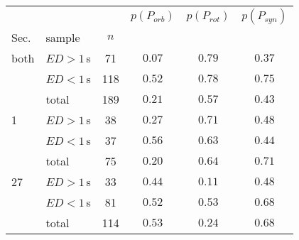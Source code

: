 \begin{tabular}{llcccc}
\hline
          &  &      & $p(P_{orb})$ & $p(P_{rot})$ & $p(P_{syn})$ \\
Sec. & sample &     $n$ &              &              &              \\
\hline
both & $ED>1\,$s &   71 &       $\mathbf{0.07}$ &       $0.79$ &       $0.37$ \\
          & $ED<1\,$s &  118 &       $0.52$ &       $0.78$ &       $0.75$ \\
          & total &  189 &       $0.21$ &       $0.57$ &       $0.43$ \\
1 & $ED>1\,$s &   38 &       $0.27$ &       $0.71$ &       $0.48$ \\
          & $ED<1\,$s &   37 &       $0.56$ &       $0.63$ &       $0.44$ \\
          & total &   75 &       $0.20$ &       $0.64$ &       $0.71$ \\
27 & $ED>1\,$s &   33 &       $0.44$ &       $0.11$ &       $0.48$ \\
          & $ED<1\,$s &   81 &       $0.52$ &       $0.53$ &       $0.68$ \\
          & total &  114 &       $0.53$ &       $0.24$ &       $0.68$ \\
\hline

\end{tabular}
